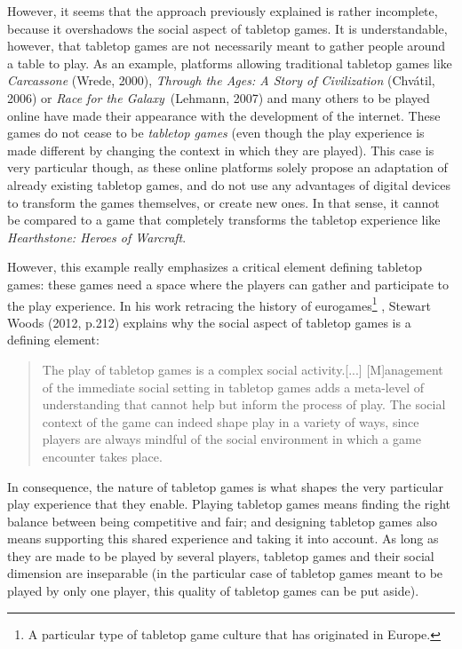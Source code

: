 However, it seems that the approach previously explained is rather incomplete, because it overshadows the social aspect of tabletop games. It is understandable, however, that tabletop games are not necessarily meant to gather people around a table to play. As an example, platforms allowing traditional tabletop games like \textit{Carcassone} (Wrede, 2000)\cite{game:carca}, \textit{Through the Ages: A Story of Civilization} (Chvátil, 2006)\cite{game:ages} or \textit{Race for the Galaxy}\ (Lehmann, 2007)\cite{game:race} and many others to be played online have made their appearance with the development of the internet.
These games do not cease to be \textit{tabletop games} (even though the play experience is made different by changing the context in which they are played). This case is very particular though, as these online platforms solely propose an adaptation of already existing tabletop games, and do not use any advantages of digital devices to transform the games themselves, or create new ones. 
In that sense, it cannot be compared to a game that completely transforms the tabletop experience like \textit{Hearthstone: Heroes of Warcraft}. 

However, this example really emphasizes a critical element defining tabletop games: these games need a space where the players can gather and participate to the play experience. In his work retracing the history of eurogames\footnote{A particular type of tabletop game culture that has originated in Europe.}
, Stewart Woods (2012, p.212)\cite{book:euro} explains why the social aspect of tabletop games is a defining element:

\begin{quotation}
The play of tabletop games is a complex social activity.[...] [M]anagement of the immediate social setting in tabletop games adds a meta-level of understanding that cannot help but inform the process of play. The social context of the game can indeed shape play in a variety of ways, since players are always mindful of the social environment in which a game encounter takes place.
\end{quotation}

In consequence, the nature of tabletop games is what shapes the very particular play experience that they enable. Playing tabletop games means finding the right balance between being competitive and fair; and designing tabletop games also means supporting this shared experience and taking it into account. As long as they are made to be played by several players, tabletop games and their social dimension are inseparable (in the particular case of tabletop games meant to be played by only one player, this quality of tabletop games can be put aside).

